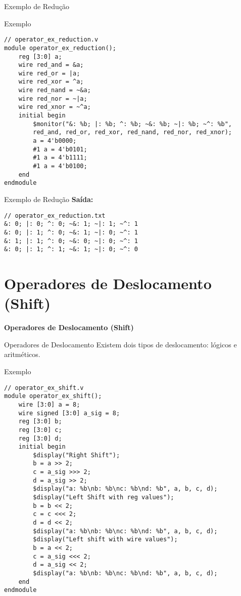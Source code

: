 \documentclass[aspectratio=169,xcolor=dvipsnames]{beamer}
\begin{document}
\begin{frame}[fragile]{Exemplo de Redução}
\scriptsize{
\begin{block}{Exemplo}
\begin{verbatim}
// operator_ex_reduction.v
module operator_ex_reduction();
    reg [3:0] a;
    wire red_and = &a;
    wire red_or = |a;
    wire red_xor = ^a;
    wire red_nand = ~&a;
    wire red_nor = ~|a;
    wire red_xnor = ~^a;
    initial begin 
        $monitor("&: %b; |: %b; ^: %b; ~&: %b; ~|: %b; ~^: %b",
        red_and, red_or, red_xor, red_nand, red_nor, red_xnor);
        a = 4'b0000;
        #1 a = 4'b0101;
        #1 a = 4'b1111;
        #1 a = 4'b0100;
    end
endmodule
\end{verbatim}
\end{block}
}

\end{frame}

\begin{frame}[fragile]{Exemplo de Redução}
\textbf{Saída:}
\begin{verbatim}
// operator_ex_reduction.txt
&: 0; |: 0; ^: 0; ~&: 1; ~|: 1; ~^: 1
&: 0; |: 1; ^: 0; ~&: 1; ~|: 0; ~^: 1
&: 1; |: 1; ^: 0; ~&: 0; ~|: 0; ~^: 1
&: 0; |: 1; ^: 1; ~&: 1; ~|: 0; ~^: 0
\end{verbatim}
\end{frame}

\section{Operadores de Deslocamento (Shift)}

\begin{frame}
    \Huge{\centerline{\textbf{Operadores de Deslocamento (Shift)}}}
\end{frame}

\begin{frame}[fragile]{Operadores de Deslocamento}
Existem dois tipos de deslocamento: lógicos e aritméticos.

\tiny{
\begin{block}{Exemplo}
\begin{verbatim}
// operator_ex_shift.v
module operator_ex_shift();
    wire [3:0] a = 8;
    wire signed [3:0] a_sig = 8;
    reg [3:0] b;
    reg [3:0] c;
    reg [3:0] d;
    initial begin
        $display("Right Shift");
        b = a >> 2;
        c = a_sig >>> 2;
        d = a_sig >> 2;
        $display("a: %b\nb: %b\nc: %b\nd: %b", a, b, c, d);
        $display("Left Shift with reg values");
        b = b << 2;
        c = c <<< 2;
        d = d << 2;
        $display("a: %b\nb: %b\nc: %b\nd: %b", a, b, c, d);
        $display("Left shift with wire values");
        b = a << 2;
        c = a_sig <<< 2;
        d = a_sig << 2;
        $display("a: %b\nb: %b\nc: %b\nd: %b", a, b, c, d);
    end
endmodule
\end{verbatim}
\end{block}
}

\end{frame}
\end{document}
